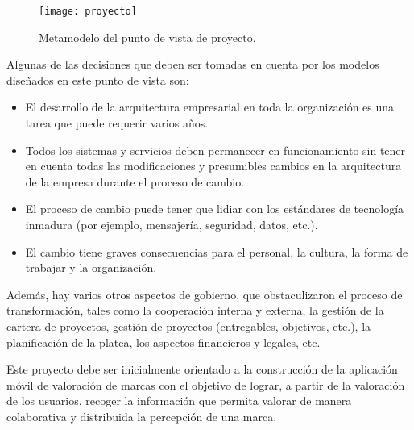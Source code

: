 \begin{figure}[H]
\centering
\texttt{[image: proyecto]}
\caption{Metamodelo del punto de vista de proyecto.}
\end{figure}

Algunas de las decisiones que deben ser tomadas en cuenta por los modelos diseñados en este punto de vista son: 
\begin{itemize}
      \item El desarrollo de la arquitectura empresarial en toda la organización es una tarea que puede requerir varios años. 
        \item Todos los sistemas y servicios deben permanecer en funcionamiento sin tener en cuenta todas las modificaciones y presumibles cambios en la arquitectura de la empresa durante el proceso de cambio. 
        \item El proceso de cambio puede tener que lidiar con los estándares de tecnología inmadura (por ejemplo, mensajería, seguridad, datos, etc.). 
        \item El cambio tiene graves consecuencias para el personal, la cultura, la forma de trabajar y la organización.    
\end{itemize}

Además, hay varios otros aspectos de gobierno, que obstaculizaron el proceso de transformación, tales como la cooperación interna y externa, la gestión de la cartera de proyectos, gestión de proyectos (entregables, objetivos, etc.), la planificación de la platea, los aspectos financieros y legales, etc.


Este proyecto debe ser inicialmente orientado a la construcción de la aplicación móvil de valoración de marcas con el objetivo de lograr, a partir de la valoración de los usuarios, recoger la información que permita valorar de manera colaborativa y distribuida la percepción de una marca. 

